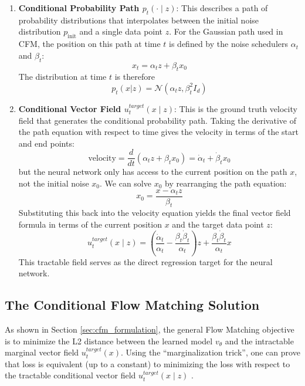 \begin{enumerate}
	\item \textbf{Conditional Probability Path $p_t( \cdot \mid z)$}: This describes a path of probability distributions that interpolates between the initial noise distribution $p_{\text{init}}$ and a single data point $z$.
        For the Gaussian path used in CFM, the position on this path at time $t$ is defined by the noise schedulers $\alpha_t$ and $\beta_{t}$:
        \begin{equation}
        	x_t = \alpha_t z + \beta_tx_0
        \end{equation}
        The distribution at time $t$ is therefore 
        \begin{equation}
        	p_t(x|z)=\mathcal{N}(\alpha_t z, \beta_t^2 I_d)
        \end{equation}
    \item \textbf{Conditional Vector Field $ u_t^{target}(x\mid z)$}: This is the ground truth velocity field that generates the conditional probability path. Taking the derivative of the path equation with respect to time gives the velocity in terms of the start and end points:
    	\begin{equation}
    		\text{velocity} = \frac{d}{dt}(\alpha_t z + \beta_t x_0) = \dot{\alpha}_t + \dot{\beta}_tx_0
    	\end{equation}
    	but the neural network only has access to the current position on the path $x$, not the initial noise $x_0$. We can solve $x_0$ by rearranging the path equation:
    	\begin{equation}
    		x_0 = \frac{x- \alpha_t z} {\beta_t}
    	\end{equation}
    	Substituting this back into the velocity equation yields the final vector field formula in terms of the current position $x$ and the target data point $z$:
    	\begin{equation}
    		u_t^{target}(x\mid z)=\left(\frac{\dot{\alpha}_t}{\alpha_t}-\frac{\beta_t\dot{\beta}_t}{\alpha_t}\right)z+\frac{\beta_t\dot{\beta}_t}{\alpha_t}x
    	\end{equation}
    	This tractable field serves as the direct regression target for the neural network.
\end{enumerate}

\subsection{The Conditional Flow Matching Solution}
As shown in Section \ref{sec:cfm_formulation}, the general Flow Matching objective is to minimize the L2 distance between the learned model $v_\theta$ and the intractable marginal vector field $u_t^{target}(x)$. Using the “marginalization trick”, one can prove that loss is equivalent (up to a constant) to minimizing the loss with respect to the tractable conditional vector field $u_t^{target}(x \mid z)$ . 



